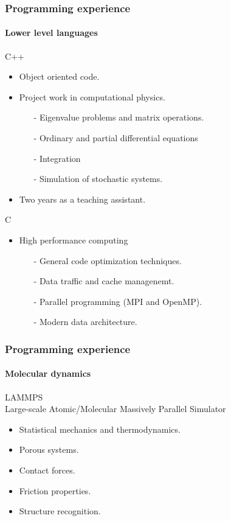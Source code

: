 \documentclass[
	10pt, %
]{beamer}
\begin{document}
\begin{frame}
	\frametitle{Programming experience}
	\framesubtitle{Lower level languages}

	{\large C++} 
	\begin{itemize}
		\item Object oriented code.
		\item Project work in computational physics.
		\begin{itemize}
			\item [-] Eigenvalue problems and matrix operations.
			\item [-] Ordinary and partial differential equations
			\item [-] Integration 
			\item [-] Simulation of stochastic systems.
		\end{itemize}
		\item Two years as a teaching assistant.
	\end{itemize}


	{\large C} 
	\begin{itemize}
		\item High performance computing 
		\begin{itemize}
			\item [-] General code optimization techniques.
			\item [-] Data traffic and cache managenemt.
			\item [-] Parallel programming (MPI and OpenMP).
			\item [-] Modern data architecture.
		\end{itemize}
	\end{itemize}

\end{frame}


\begin{frame}
	\frametitle{Programming experience}
	\framesubtitle{Molecular dynamics}

	{\large LAMMPS} \\
	Large-scale Atomic/Molecular Massively Parallel Simulator
	\begin{itemize}
		\item Statistical mechanics and thermodynamics.
		\item Porous systems. 
		\item Contact forces.
		\item Friction properties.
		\item Structure recognition.
	\end{itemize}


\end{frame}
\end{document}
